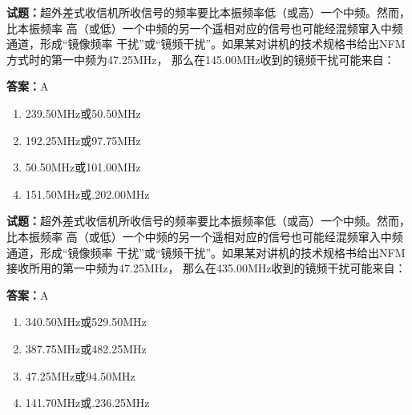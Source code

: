 \documentclass{ctexbook}
\begin{document}




\vspace{1em}

\textbf{试题：}超外差式收信机所收信号的频率要比本振频率低（或高）一个中频。然而，比本振频率
高（或低）一个中频的另一个遥相对应的信号也可能经混频窜入中频通道，形成“镜像频率
干扰”或“镜频干扰”。如果某对讲机的技术规格书给出NFM方式时的第一中频为47.25MHz，
那么在145.00MHz收到的镜频干扰可能来自： 

\textbf{答案：}A 

\begin{enumerate}[leftmargin=3em]
  \item 239.50MHz或50.50MHz 

  \item 192.25MHz或97.75MHz 

  \item 50.50MHz或101.00MHz 

  \item 151.50MHz或.202.00MHz 

\end{enumerate}





\vspace{1em}

\textbf{试题：}超外差式收信机所收信号的频率要比本振频率低（或高）一个中频。然而，比本振频率
高（或低）一个中频的另一个遥相对应的信号也可能经混频窜入中频通道，形成“镜像频率
干扰”或“镜频干扰”。如果某对讲机的技术规格书给出NFM接收所用的第一中频为47.25MHz，
那么在435.00MHz收到的镜频干扰可能来自： 

\textbf{答案：}A 

\begin{enumerate}[leftmargin=3em]
  \item 340.50MHz或529.50MHz 

  \item 387.75MHz或482.25MHz 

  \item 47.25MHz或94.50MHz 

  \item 141.70MHz或.236.25MHz 

\end{enumerate}



\end{document}
